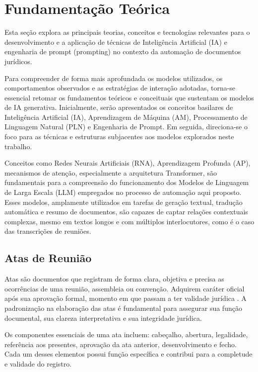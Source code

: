 

\chapter{Fundamentação Teórica}
\label{cap:fundamentacao-teorica}

Esta seção explora as principais teorias, conceitos e tecnologias relevantes para o desenvolvimento e a aplicação de técnicas de Inteligência Artificial (IA) e engenharia de prompt (prompting) no contexto da automação de documentos jurídicos.

Para compreender de forma mais aprofundada os modelos utilizados, os comportamentos observados e as estratégias de interação adotadas, torna-se essencial retomar os fundamentos teóricos e conceituais que sustentam os modelos de IA generativa. Inicialmente, serão apresentados os conceitos basilares de Inteligência Artificial (IA), Aprendizagem de Máquina (AM), Processamento de Linguagem Natural (PLN) e Engenharia de Prompt. Em seguida, direciona-se o foco para as técnicas e estruturas subjacentes aos modelos explorados neste trabalho.

Conceitos como Redes Neurais Artificiais (RNA), Aprendizagem Profunda (AP), mecanismos de atenção, especialmente a arquitetura Transformer, são fundamentais para a compreensão do funcionamento dos Modelos de Linguagem de Larga Escala (LLM) empregados no processo de automação aqui proposto. Esses modelos, amplamente utilizados em tarefas de geração textual, tradução automática e resumo de documentos, são capazes de captar relações contextuais complexas, mesmo em textos longos e com múltiplos interlocutores, como é o caso das transcrições de reuniões.

\section{Atas de Reunião}
\label{sec:atas-reuniao}

Atas são documentos que registram de forma clara, objetiva e precisa as ocorrências de uma reunião, assembleia ou convenção. Adquirem caráter oficial após sua aprovação formal, momento em que passam a ter validade jurídica \cite{ferreira_redacao_2015}. A padronização na elaboração das atas é fundamental para assegurar sua função documental, sua clareza interpretativa e sua integridade jurídica.

Os componentes essenciais de uma ata incluem: cabeçalho, abertura, legalidade, referência aos presentes, aprovação da ata anterior, desenvolvimento e fecho. Cada um desses elementos possui função específica e contribui para a completude e validade do registro.

